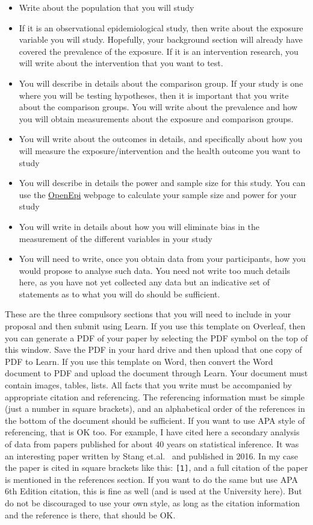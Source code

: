 \documentclass[a4paper]{article}
\begin{document}
\begin{itemize}
\item Write about the population that you will study
\item If it is an observational epidemiological study, then write about the exposure variable you will study. Hopefully, your background section will already have covered the prevalence of the exposure. If it is an intervention research, you will write about the intervention that you want to test.
\item You will describe in details about the comparison group. If your study is one where you will be testing hypotheses, then it is important that you write about the comparison groups. You will write about the prevalence and how you will obtain measurements about the exposure and comparison groups.
\item You will write about the outcomes in details, and specifically about how you will measure the exposure/intervention and the health outcome you want to study
\item You will describe in details the power and sample size for this study. You can use the \href{http://www.openepi.com/Menu/OE_Menu.htm}{OpenEpi} webpage to calculate your sample size and power for your study
\item You will write in details about how you will eliminate bias in the measurement of the different variables in your study
\item You will need to write, once you obtain data from your participants, how you would propose to analyse such data. You need not write too much details here, as you have not yet collected any data but an indicative set of statements as to what you will do should be sufficient. 
\end{itemize}

These are the three compulsory sections that you will need to include in your proposal and then submit using Learn. If you use this template on Overleaf, then you can generate a PDF of your paper by selecting the PDF symbol on the top of this window. Save the PDF in your hard drive and then upload that one copy of PDF to Learn. If you use this template on Word, then convert the Word document to PDF and upload the document through Learn. Your document must contain images, tables, lists. All facts that you write must be accompanied by appropriate citation and referencing. The referencing information must be simple (just a number in square brackets), and an alphabetical order of the references in the bottom of the document should be sufficient. If you want to use APA style of referencing, that is OK too. For example, I have cited here a secondary analysis of data from papers published for about 40 years on statistical inference. It was an interesting paper written by Stang et.al.~\cite{masarati2013formulation} and published in 2016. In my case the paper is cited in square brackets like this: \texttt{[1]}, and a full citation of the paper is mentioned in the references section. If you want to do the same but use APA 6th Edition citation, this is fine as well (and is used at the University here). But do not be discouraged to use your own style, as long as the citation information and the reference is there, that should be OK. 
\end{document}
